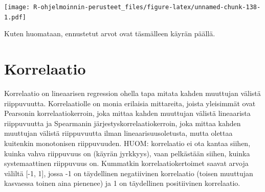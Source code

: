\documentclass[
]{book}
\newenvironment{Shaded}{\begin{snugshade}}{\end{snugshade}}
\newcommand{\AttributeTok}[1]{\textcolor[rgb]{0.77,0.63,0.00}{#1}}
\newcommand{\CommentTok}[1]{\textcolor[rgb]{0.56,0.35,0.01}{\textit{#1}}}
\newcommand{\DecValTok}[1]{\textcolor[rgb]{0.00,0.00,0.81}{#1}}
\newcommand{\FunctionTok}[1]{\textcolor[rgb]{0.00,0.00,0.00}{#1}}
\newcommand{\NormalTok}[1]{#1}
\newcommand{\OtherTok}[1]{\textcolor[rgb]{0.56,0.35,0.01}{#1}}
\newcommand{\SpecialCharTok}[1]{\textcolor[rgb]{0.00,0.00,0.00}{#1}}
\newcommand{\StringTok}[1]{\textcolor[rgb]{0.31,0.60,0.02}{#1}}
\begin{document}
\begin{Shaded}
\end{Shaded}

\texttt{[image: R-ohjelmoinnin-perusteet\_files/figure-latex/unnamed-chunk-138-1.pdf]}

Kuten huomataan, ennustetut arvot ovat täsmälleen käyrän päällä.

\hypertarget{korrelaatio}{%
\section{Korrelaatio}\label{korrelaatio}}

Korrelaatio on lineaarisen regression ohella tapa mitata kahden muuttujan välistä riippuvuutta. Korrelaatiolle on monia erilaisia mittareita, joista yleisimmät ovat Pearsonin korrelaatiokerroin, joka mittaa kahden muuttujan välistä lineaarista riippuvuutta ja Spearmanin järjestyskorrelaatiokerroin, joka mittaa kahden muuttujan välistä riippuvuutta ilman lineaarisuusoletusta, mutta olettaa kuitenkin monotonisen riippuvuuden. HUOM: korrelaatio ei ota kantaa siihen, kuinka vahva riippuvuus on (käyrän jyrkkyys), vaan pelkästään siihen, kuinka systemaattinen riippuvuus on. Kummatkin korrelaatiokertoimet saavat arvoja väliltä {[}-1, 1{]}, jossa -1 on täydellinen negatiivinen korrelaatio (toisen muuttujan kasvaessa toinen aina pienenee) ja 1 on täydellinen positiivinen korrelaatio.
\end{document}
